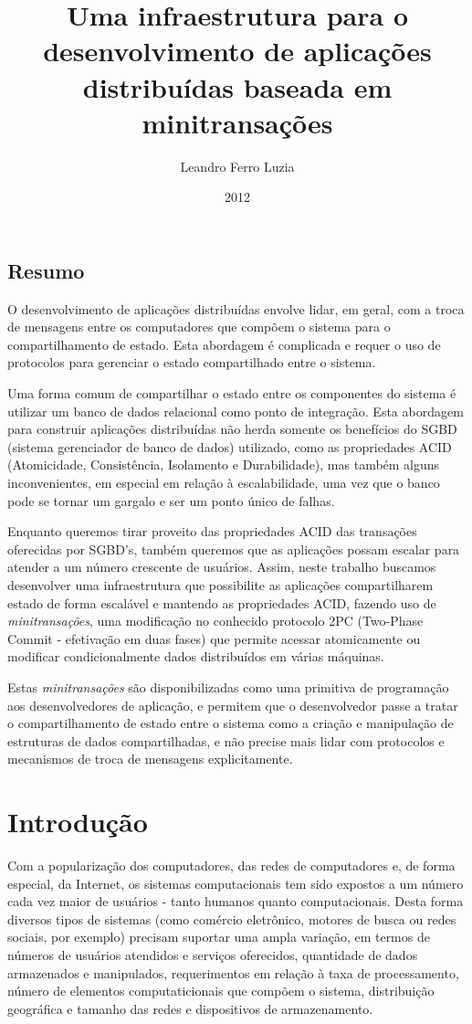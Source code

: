 \documentclass[a4paper,12pt]{report}
\title{Uma infraestrutura para o desenvolvimento de aplicações distribuídas baseada em minitransações}
\author{Leandro Ferro Luzia}
\date{2012}
\begin{document}
\pagestyle{headings}
\maketitle
\section*{Resumo}
O desenvolvimento de aplicações distribuídas envolve lidar, em geral, com a troca de mensagens entre os computadores que compõem o sistema para o compartilhamento de estado. Esta abordagem é complicada e requer o uso de protocolos para gerenciar o estado compartilhado entre o sistema.

Uma forma comum de compartilhar o estado entre os componentes do sistema é utilizar um banco de dados relacional como ponto de integração. Esta abordagem para construir aplicações distribuídas não herda somente os benefícios do SGBD (sistema gerenciador de banco de dados) utilizado, como as propriedades ACID (Atomicidade, Consistência, Isolamento e Durabilidade), mas também alguns inconvenientes, em especial em relação à escalabilidade, uma vez que o banco pode se tornar um gargalo e ser um ponto único de falhas.

Enquanto queremos tirar proveito das propriedades ACID das transações oferecidas por SGBD's, também queremos que as aplicações possam escalar para atender a um número crescente de usuários. Assim, neste trabalho buscamos desenvolver uma infraestrutura que possibilite as aplicações compartilharem estado de forma escalável e mantendo as propriedades ACID, fazendo uso de {\em minitransações}, uma modificação no conhecido protocolo 2PC (Two-Phase Commit - efetivação em duas fases) que permite acessar atomicamente ou modificar condicionalmente dados distribuídos em várias máquinas.

Estas {\em minitransações} são disponibilizadas como uma primitiva de programação aos desenvolvedores de aplicação, e permitem que o desenvolvedor passe a tratar o compartilhamento de estado entre o sistema como a criação e manipulação de estruturas de dados compartilhadas, e não precise mais lidar com protocolos e mecanismos de troca de mensagens explicitamente.
\tableofcontents
\listoftables
\listoffigures

\chapter{Introdução}
Com a popularização dos computadores, das redes de computadores e, de forma especial, da Internet, os sistemas computacionais tem sido expostos a um número cada vez maior de usuários - tanto humanos quanto computacionais. Desta forma diversos tipos de sistemas (como comércio eletrônico, motores de busca ou redes sociais, por exemplo) precisam suportar uma ampla variação, em termos de números de usuários atendidos e serviços oferecidos, quantidade de dados armazenados e manipulados, requerimentos em relação à taxa de processamento, número de elementos computaticionais que compõem o sistema, distribuição geográfica e tamanho das redes e dispositivos de armazenamento. 
\end{document}
